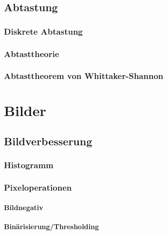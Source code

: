 \documentclass[a4paper, 11pt, accentcolor = tud3b]{tudreport}
\begin{document}
		\section{Abtastung} %

			\subsection{Diskrete Abtastung} %

			\subsection{Abtasttheorie} %

			\subsection{Abtasttheorem von Whittaker-Shannon} %

	\chapter{Bilder} %

		\section{Bildverbesserung} %

			\subsection{Histogramm} %

			\subsection{Pixeloperationen} %

				\subsubsection{Bildnegativ} %

				\subsubsection{Binärisierung/Thresholding} %
\end{document}
